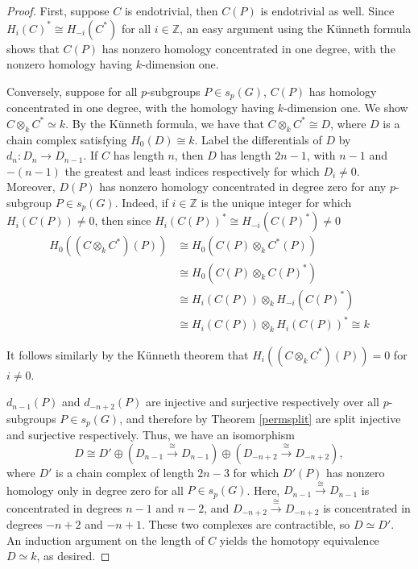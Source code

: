 \documentclass[10pt,letterpaper, boxed, cm]{amsart}
\newcommand{\Z}{\mathbb{Z}}
\theoremstyle{remark}
\theoremstyle{definition}
\begin{document}
	\begin{proof}
		First, suppose $C$ is endotrivial, then $C(P)$ is endotrivial as well. Since $H_i(C)^* \cong H_{-i}(C^*)$ for all $i \in \Z$, an easy argument using the K{\"u}nneth formula shows that $C(P)$ has nonzero homology concentrated in one degree, with the nonzero homology having $k$-dimension one.

		Conversely, suppose for all $p$-subgroups $P \in s_p(G)$, $C(P)$ has homology concentrated in one degree, with the homology having $k$-dimension one. We show $C\otimes_k C^* \simeq k$. By the K{\"u}nneth formula, we have that $C \otimes_k C^* \cong D$, where $D$ is a chain complex satisfying $ H_0(D) \cong k$. Label the differentials of $D$ by $d_n: D_n \to D_{n-1}$. If $C$ has length $n$, then $D$ has length $2n - 1$, with $n-1$ and $-(n-1)$ the greatest and least indices respectively for which $D_i \neq 0$. Moreover, $D(P)$ has nonzero homology concentrated in degree zero for any $p$-subgroup $P\in s_p(G)$. Indeed, if $i \in \Z$ is the unique integer for which $H_i(C(P))\neq 0$, then since $H_i(C(P))^* \cong H_{-i}(C(P)^*) \neq 0$
        \begin{align*}
            H_0((C\otimes_k C^*)(P)) &\cong H_0(C(P) \otimes_k C^*(P))\\
            &\cong H_0(C(P) \otimes_k C(P)^*) \\
            &\cong H_i(C(P)) \otimes_k H_{-i}(C(P)^*) \\
            &\cong H_i(C(P)) \otimes_k H_i(C(P))^* \cong  k
        \end{align*}

        It follows similarly by the K\"unneth theorem that $H_i((C\otimes_k C^*)(P)) = 0$ for $i \neq 0.$

		$d_{n-1}(P)$ and $d_{-n + 2}(P)$ are injective and surjective respectively over all $p$-subgroups $P\in s_p(G)$, and therefore by Theorem \ref{permsplit} are split injective and surjective respectively. Thus, we have an isomorphism \[D \cong D' \oplus (D_{n-1} \xrightarrow{\cong} D_{n-1}) \oplus (D_{-n + 2} \xrightarrow{\cong} D_{-n + 2}),\] where $D'$ is a chain complex of length $2n - 3$ for which $D'(P)$ has nonzero homology only in degree zero for all $P \in s_p(G)$. Here, $D_{n-1} \xrightarrow{\cong} D_{n-1}$ is concentrated in degrees $n-1$ and $n-2$, and $D_{-n + 2} \xrightarrow{\cong} D_{-n + 2}$ is concentrated in degrees $-n+2$ and $-n+1$. These two complexes are contractible, so $D \simeq D'$. An induction argument on the length of $C$ yields the homotopy equivalence $D \simeq k$, as desired.
	\end{proof}
\end{document}
